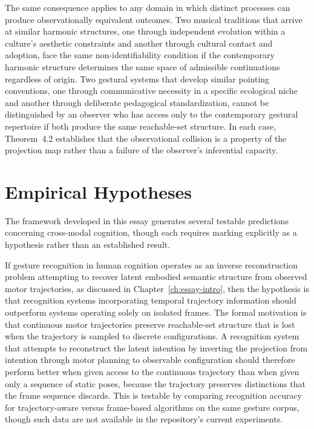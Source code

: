 The same consequence applies to any domain in which distinct processes can produce observationally equivalent outcomes. Two musical traditions that arrive at similar harmonic structures, one through independent evolution within a culture's aesthetic constraints and another through cultural contact and adoption, face the same non-identifiability condition if the contemporary harmonic structure determines the same space of admissible continuations regardless of origin. Two gestural systems that develop similar pointing conventions, one through communicative necessity in a specific ecological niche and another through deliberate pedagogical standardization, cannot be distinguished by an observer who has access only to the contemporary gestural repertoire if both produce the same reachable-set structure. In each case, Theorem~4.2 establishes that the observational collision is a property of the projection map rather than a failure of the observer's inferential capacity.

\section{Empirical Hypotheses}

The framework developed in this essay generates several testable predictions concerning cross-modal cognition, though each requires marking explicitly as a hypothesis rather than an established result.

If gesture recognition in human cognition operates as an inverse reconstruction problem attempting to recover latent embodied semantic structure from observed motor trajectories, as discussed in Chapter~\ref{ch:essay-intro}, then the hypothesis is that recognition systems incorporating temporal trajectory information should outperform systems operating solely on isolated frames. The formal motivation is that continuous motor trajectories preserve reachable-set structure that is lost when the trajectory is sampled to discrete configurations. A recognition system that attempts to reconstruct the latent intention by inverting the projection from intention through motor planning to observable configuration should therefore perform better when given access to the continuous trajectory than when given only a sequence of static poses, because the trajectory preserves distinctions that the frame sequence discards. This is testable by comparing recognition accuracy for trajectory-aware versus frame-based algorithms on the same gesture corpus, though such data are not available in the repository's current experiments.

